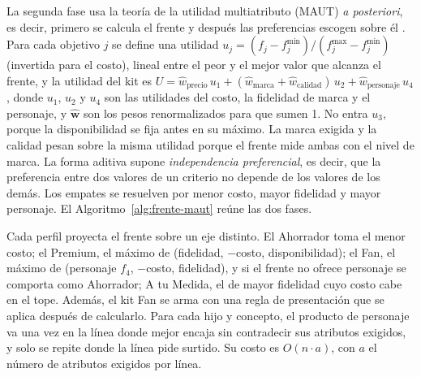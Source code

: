 La segunda fase usa la teoría de la utilidad multiatributo (MAUT) \citep{keeney_decisions_1976}
\emph{a posteriori}, es decir, primero se calcula el frente y después las preferencias escogen sobre
él \citep{miettinen_nonlinear_1999}. Para cada objetivo $j$ se define una utilidad
$u_j=(f_j-f_j^{\min})/(f_j^{\max}-f_j^{\min})$ (invertida para el costo), lineal entre el peor y el
mejor valor que alcanza el frente, y la utilidad del kit es
$U=\hat w_{\mathrm{precio}}\,u_1+(\hat w_{\mathrm{marca}}+\hat w_{\mathrm{calidad}})\,u_2+\hat w_{\mathrm{personaje}}\,u_4$,
donde $u_1$, $u_2$ y $u_4$ son las utilidades del costo, la fidelidad de marca y el personaje, y $\hat{\mathbf{w}}$ son los pesos renormalizados para que sumen 1. No entra $u_3$, porque la
disponibilidad se fija antes en su máximo. La marca exigida y la
calidad pesan sobre la misma utilidad porque el frente mide ambas con el nivel de marca. La forma
aditiva supone \emph{independencia preferencial}, es decir, que la preferencia entre dos valores de
un criterio no depende de los valores de los demás. Los empates se resuelven por menor costo, mayor fidelidad y mayor personaje.
El Algoritmo~\ref{alg:frente-maut} reúne las dos fases.

Cada perfil proyecta el frente sobre un eje distinto. El Ahorrador toma el menor costo; el Premium, el máximo de
(fidelidad, $-$costo, disponibilidad); el Fan, el máximo de (personaje $f_4$, $-$costo, fidelidad), y si el frente no ofrece personaje se comporta como Ahorrador;
A tu Medida, el de mayor fidelidad cuyo costo cabe en el tope. Además, el kit Fan se arma con una regla de presentación que se aplica después de
calcularlo. Para cada hijo y concepto, el producto de personaje va una vez en la línea donde mejor
encaja sin contradecir sus atributos exigidos, y solo se repite donde la línea pide surtido. Su costo
es $O(n\cdot a)$, con $a$ el número de atributos exigidos por línea.

